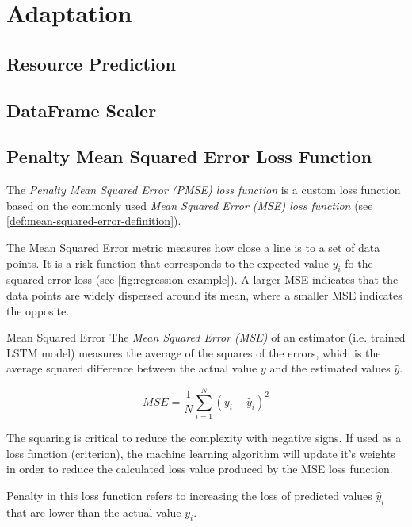   

\section{Adaptation}
  \subsection{Resource Prediction}
  \subsection{DataFrame Scaler}
  \subsection{Penalty Mean Squared Error Loss Function}
  \label{sec:penalty-mse-loss-function-architecture-and-implementation}

    The \emph{Penalty Mean Squared Error (PMSE) loss function} is a custom loss function based on the commonly used \emph{Mean Squared Error (MSE) loss function} \cite{koksoyMultiresponseRobustDesign2006} (see \ref{def:mean-squared-error-definition}). 
    
    The Mean Squared Error metric measures how close a  line is to a set of data points. It is a risk function that corresponds to the expected value $y_i$ fo the squared error loss (see \ref{fig:regression-example}). A larger MSE indicates that the data points are widely dispersed around its mean, where a smaller MSE indicates the opposite.

    \begin{pabox}{Mean Squared Error}
    \label{def:mean-squared-error-definition}
      The \emph{Mean Squared Error (MSE)} of an estimator (i.e. trained LSTM model) measures the average of the squares of the errors, which is the average squared difference between the actual value $y$ and the estimated values $\hat{y}$.

      $$MSE = \frac{1}{N} \sum_{i = 1}^{N}\left(y_i - \hat{y}_i\right)^2$$

      The squaring is critical to reduce the complexity with negative signs. If used as a loss function (criterion), the machine learning algorithm will update it's weights in order to reduce the calculated loss value produced by the MSE loss function.
    \end{pabox}

    Penalty in this loss function refers to increasing the loss of predicted values $\hat{y}_i$ that are lower than the actual value $y_i$.

